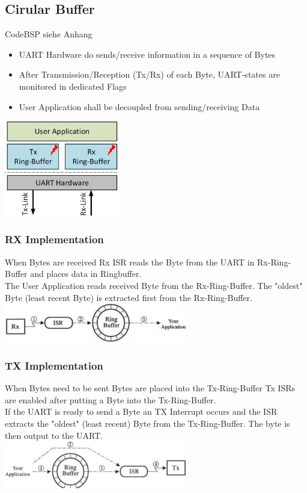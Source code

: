 \begin{minipage}{12cm}
    \subsection{Cirular Buffer}
    CodeBSP siehe Anhang \label{CircularBuffer}
	\begin{itemize}
		\item UART Hardware do sends/receive information in a sequence of Bytes
		\item After Transmission/Reception (Tx/Rx) of each Byte, UART-states are monitored in dedicated Flags
		\item User Application shall be decoupled from sending/receiving Data
	\end{itemize}
\end{minipage}
\begin{minipage}{5cm}
	\includegraphics[width=5cm]{images/ringbuffer.png}
\end{minipage}
\begin{multicols}{2}
\subsubsection{RX Implementation}
When Bytes are received Rx ISR reads the Byte from the UART in Rx-Ring-Buffer and places data in Ringbuffer. \\
The User Application reads received Byte from the Rx-Ring-Buffer. The "oldest" Byte (least recent Byte) is extracted first from the Rx-Ring-Buffer.\\
\includegraphics[width=8cm]{images/rx_buffer.png}
\subsubsection{TX Implementation}
When Bytes need to be sent Bytes are placed into the Tx-Ring-Buffer Tx ISRs are enabled after putting a Byte into the Tx-Ring-Buffer. \\
If the UART is ready to send a Byte an TX Interrupt occurs and the ISR extracts the "oldest" (least recent) Byte from the Tx-Ring-Buffer. The byte is then output to the UART.\\
\includegraphics[width=8cm]{images/tx_buffer.png}
\end{multicols}
